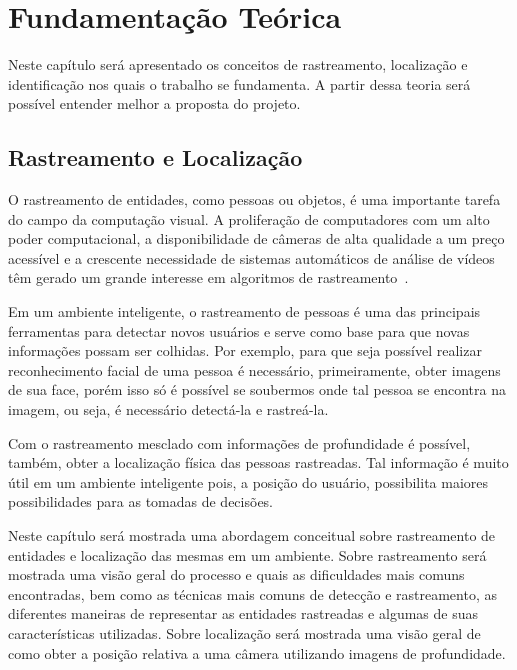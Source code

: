\chapter{Fundamentação Teórica}

	Neste capítulo será apresentado os conceitos de rastreamento, localização e identificação nos quais o trabalho se fundamenta. A partir dessa teoria será possível entender melhor a proposta do projeto.

\section{Rastreamento e Localização}

	O rastreamento de entidades, como pessoas ou objetos, é uma importante tarefa
	do campo da computação visual. A proliferação de computadores com um alto poder
	computacional, a disponibilidade de câmeras de alta qualidade a um preço
	acessível e a crescente necessidade de sistemas automáticos de análise de
	vídeos têm gerado um grande interesse em algoritmos de rastreamento~\cite{yilmaz}.

	Em um ambiente inteligente, o rastreamento de pessoas é uma das principais
	ferramentas para detectar novos usuários e serve como base para que novas
	informações possam ser colhidas. Por exemplo, para que seja possível realizar
	reconhecimento facial de uma pessoa é necessário, primeiramente, obter imagens
	de sua face, porém isso só é possível se soubermos onde tal pessoa se encontra
	na imagem, ou seja, é necessário detectá-la e rastreá-la.

	Com o rastreamento mesclado com informações de profundidade é possível,
	também, obter a localização física das pessoas rastreadas. Tal informação é
	muito útil em um ambiente inteligente pois, a posição do usuário,
	possibilita maiores possibilidades para as tomadas de decisões.

	Neste capítulo será mostrada uma abordagem conceitual sobre rastreamento de
	entidades e localização das mesmas em um ambiente. Sobre rastreamento será
	mostrada uma visão geral do processo e quais as dificuldades mais comuns
	encontradas, bem como as técnicas mais comuns de detecção e rastreamento, as
	diferentes maneiras de representar as entidades rastreadas e algumas de suas
	características utilizadas. Sobre localização será mostrada uma visão geral de
	como obter a posição relativa a uma câmera utilizando imagens de profundidade.

	
	

